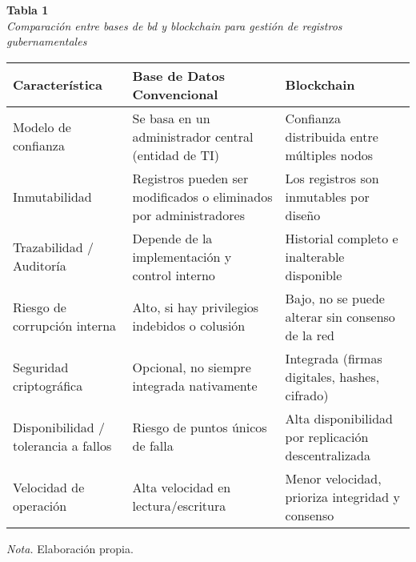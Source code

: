 \begin{table}[htbp]
    \begin{flushleft}
        \textbf{Tabla 1}\\[2em]
        \textit{Comparación entre bases de bd y blockchain para gestión de registros gubernamentales}
    \end{flushleft}
    \vspace{1em}
    \centering
    \begin{tabular}{p{4.5cm} p{5.2cm} p{5.2cm}}
        \toprule
        \textbf{Característica} & \textbf{Base de Datos Convencional} & \textbf{Blockchain} \\
        \midrule
        Modelo de confianza & Se basa en un administrador central (entidad de TI) & Confianza distribuida entre múltiples nodos \\
        Inmutabilidad & Registros pueden ser modificados o eliminados por administradores & Los registros son inmutables por diseño \\
        Trazabilidad / Auditoría & Depende de la implementación y control interno & Historial completo e inalterable disponible \\
        Riesgo de corrupción interna & Alto, si hay privilegios indebidos o colusión & Bajo, no se puede alterar sin consenso de la red \\
        Seguridad criptográfica & Opcional, no siempre integrada nativamente & Integrada (firmas digitales, hashes, cifrado) \\
        Disponibilidad / tolerancia a fallos & Riesgo de puntos únicos de falla & Alta disponibilidad por replicación descentralizada \\
        Velocidad de operación & Alta velocidad en lectura/escritura & Menor velocidad, prioriza integridad y consenso \\
        \bottomrule
    \end{tabular}
    \vspace{2em}
    \begin{flushleft}
        \textit{Nota.} Elaboración propia.
    \end{flushleft}
    \label{tab:comparacion_bd_blockchain}
\end{table}